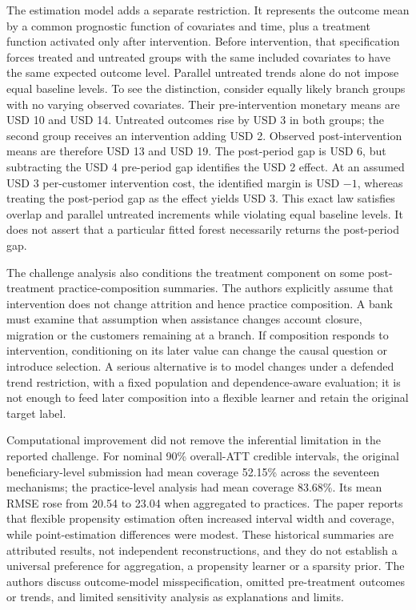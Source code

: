 The estimation model adds a separate restriction. It represents the outcome mean by a common prognostic function of covariates and time, plus a treatment function activated only after intervention. Before intervention, that specification forces treated and untreated groups with the same included covariates to have the same expected outcome level. Parallel untreated trends alone do not impose equal baseline levels. To see the distinction, consider equally likely branch groups with no varying observed covariates. Their pre-intervention monetary means are USD 10 and USD 14. Untreated outcomes rise by USD 3 in both groups; the second group receives an intervention adding USD 2. Observed post-intervention means are therefore USD 13 and USD 19. The post-period gap is USD 6, but subtracting the USD 4 pre-period gap identifies the USD 2 effect. At an assumed USD 3 per-customer intervention cost, the identified margin is USD $-1$, whereas treating the post-period gap as the effect yields USD 3. This exact law satisfies overlap and parallel untreated increments while violating equal baseline levels. It does not assert that a particular fitted forest necessarily returns the post-period gap.~\citep{rel17flexpaper,rel17flexwitness}

The challenge analysis also conditions the treatment component on some post-treatment practice-composition summaries. The authors explicitly assume that intervention does not change attrition and hence practice composition. A bank must examine that assumption when assistance changes account closure, migration or the customers remaining at a branch. If composition responds to intervention, conditioning on its later value can change the causal question or introduce selection. A serious alternative is to model changes under a defended trend restriction, with a fixed population and dependence-aware evaluation; it is not enough to feed later composition into a flexible learner and retain the original target label.~\citep{rel17flexpaper}

Computational improvement did not remove the inferential limitation in the reported challenge. For nominal 90\% overall-ATT credible intervals, the original beneficiary-level submission had mean coverage 52.15\% across the seventeen mechanisms; the practice-level analysis had mean coverage 83.68\%. Its mean RMSE rose from 20.54 to 23.04 when aggregated to practices. The paper reports that flexible propensity estimation often increased interval width and coverage, while point-estimation differences were modest. These historical summaries are attributed results, not independent reconstructions, and they do not establish a universal preference for aggregation, a propensity learner or a sparsity prior. The authors discuss outcome-model misspecification, omitted pre-treatment outcomes or trends, and limited sensitivity analysis as explanations and limits.~\citep{rel17flexpaper}


